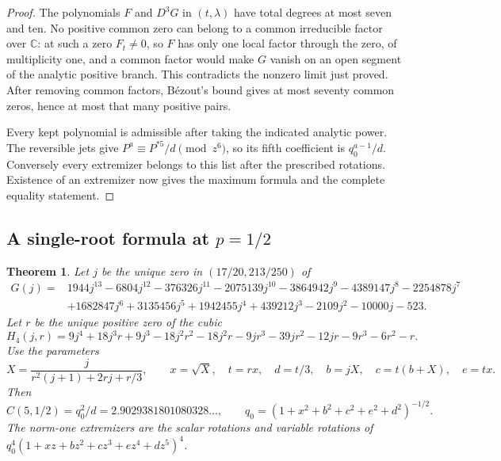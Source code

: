 \documentclass[11pt]{article}
\newtheorem{theorem}{Theorem}
\begin{document}
\begin{proof}
The polynomials \(F\) and \(D^3G\) in \((t,\lambda)\) have
total degrees at most seven and ten. No positive common zero
can belong to a common irreducible factor over \(\mathbb C\):
at such a zero \(F_t\ne0\), so \(F\) has only one local factor
through the zero, of multiplicity one, and a common factor
would make \(G\) vanish on an open segment of the analytic
positive branch. This contradicts the nonzero limit just proved.
After removing common factors, B\'ezout's bound gives at most
seventy common zeros, hence at most that many positive pairs.

Every kept polynomial is admissible after taking the indicated
analytic power. The reversible jets give
\(P^a\equiv P^{*5}/d\pmod{z^6}\), so its fifth coefficient is
\(q_0^{a-1}/d\). Conversely every extremizer belongs to this
list after the prescribed rotations. Existence of an extremizer
now gives the maximum formula and the complete equality statement.
\end{proof}


\subsection{A single-root formula at \texorpdfstring{\(p=1/2\)}{p=1/2}}

\begin{theorem}
Let \(j\) be the unique zero in \((17/20,213/250)\) of
\begin{align*}
 G(j)={}&1944j^{13}-6804j^{12}-376326j^{11}-2075139j^{10}
 -3864942j^9-4389147j^8-2254878j^7\\
 &+1682847j^6+3135456j^5+1942455j^4+439212j^3
 -2109j^2-10000j-523.
\end{align*}
Let \(r\) be the unique positive zero of the cubic
\[
 H_4(j,r)=9j^4+18j^3r+9j^3-18j^2r^2-18j^2r-9jr^3
              -39jr^2-12jr-9r^3-6r^2-r .
\]
Use the parameters
\[
 X=\frac{j}{r^2(j+1)+2rj+r/3},\qquad x=\sqrt X,\quad
 t=rx,\quad d=t/3,\quad b=jX,\quad c=t(b+X),\quad e=tx.
\]
Then
\[
 C(5,1/2)=q_0^2/d=2.9029381801080328\ldots,\qquad
 q_0=(1+x^2+b^2+c^2+e^2+d^2)^{-1/2}.
\]
The norm-one extremizers are the scalar rotations and variable
rotations of \(q_0^4(1+xz+bz^2+cz^3+ez^4+dz^5)^4\).

\end{theorem}
\end{document}
